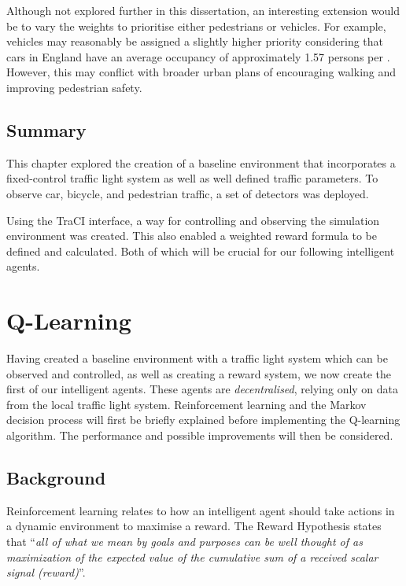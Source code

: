 \documentclass[a4paper]{report}
\begin{document}
Although not explored further in this dissertation, an interesting extension would be to vary the weights to prioritise either pedestrians or vehicles. For example, vehicles may reasonably be assigned a slightly higher priority considering that cars in England have an average occupancy of approximately 1.57 persons per \cite{StatistaCarOccupancy}. However, this may conflict with broader urban plans of encouraging walking and improving pedestrian safety.

\section{Summary}

This chapter explored the creation of a baseline environment that incorporates a fixed-control traffic light system as well as well defined traffic parameters. To observe car, bicycle, and pedestrian traffic, a set of detectors was deployed.

Using the TraCI interface, a way for controlling and observing the simulation environment was created. This also enabled a weighted reward formula to be defined and calculated. Both of which will be crucial for our following intelligent agents.

\chapter{Q-Learning}

Having created a baseline environment with a traffic light system which can be observed and controlled, as well as creating a reward system, we now create the first of our intelligent agents. These agents are \emph{decentralised}, relying only on data from the local traffic light system. Reinforcement learning and the Markov decision process will first be briefly explained before implementing the Q-learning algorithm. The performance and possible improvements will then be considered.

\section{Background}

Reinforcement learning relates to how an intelligent agent should take actions in a dynamic environment to maximise a reward. The Reward Hypothesis states that ``\emph{all of what we mean by goals and purposes can be well thought of as maximization of the expected value of the cumulative sum of a received scalar signal (reward)}''\cite{RichardSutton1990}.
\end{document}
